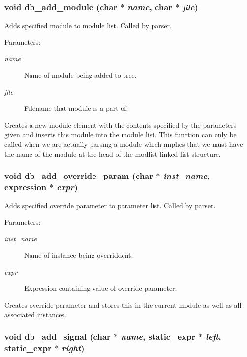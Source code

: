 \subsubsection{\setlength{\rightskip}{0pt plus 5cm}void db\_\-add\_\-module (char $\ast$ {\em name}, char $\ast$ {\em file})}\label{db_8h_a3}


Adds specified module to module list. Called by parser.

\begin{Desc}
\item[Parameters:]
\begin{description}
\item[{\em name}]Name of module being added to tree. \item[{\em file}]Filename that module is a part of.\end{description}
\end{Desc}
Creates a new module element with the contents specified by the parameters given and inserts this module into the module list. This function can only be called when we are actually parsing a module which implies that we must have the name of the module at the head of the modlist linked-list structure. 
\subsubsection{\setlength{\rightskip}{0pt plus 5cm}void db\_\-add\_\-override\_\-param (char $\ast$ {\em inst\_\-name}, {\bf expression} $\ast$ {\em expr})}\label{db_8h_a5}


Adds specified override parameter to parameter list. Called by parser.

\begin{Desc}
\item[Parameters:]
\begin{description}
\item[{\em inst\_\-name}]Name of instance being overriddent. \item[{\em expr}]Expression containing value of override parameter.\end{description}
\end{Desc}
Creates override parameter and stores this in the current module as well as all associated instances. 
\subsubsection{\setlength{\rightskip}{0pt plus 5cm}void db\_\-add\_\-signal (char $\ast$ {\em name}, {\bf static\_\-expr} $\ast$ {\em left}, {\bf static\_\-expr} $\ast$ {\em right})}\label{db_8h_a8}


